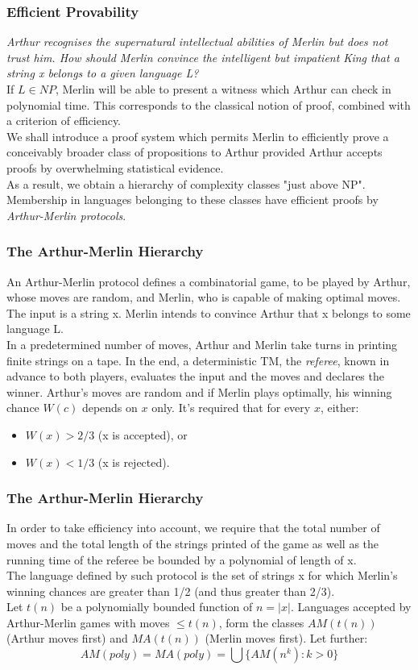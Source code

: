 \documentclass{beamer}
\begin{document}
\begin{frame}
\frametitle{Efficient Provability}
\textit{Arthur recognises the supernatural intellectual abilities of Merlin but does not trust him. How should Merlin convince the intelligent but impatient King that a string x belongs to a given language L?}\\
If $L \in NP$, Merlin will be able to present a witness which Arthur can check in polynomial time. This corresponds to the classical notion of proof, combined with a criterion of efficiency.\\
We shall introduce a proof system which permits Merlin to efficiently prove a conceivably broader class of propositions to Arthur provided Arthur accepts proofs by overwhelming statistical evidence.\\
As a result, we obtain a hierarchy of complexity classes "just above NP". Membership in languages belonging to these classes have efficient proofs by \textit{Arthur-Merlin protocols}.
\end{frame}

\begin{frame}
\frametitle{The Arthur-Merlin Hierarchy}
An Arthur-Merlin protocol defines a combinatorial game, to be played by Arthur, whose moves are random, and Merlin, who is capable of making optimal moves.\\
The input is a string x. Merlin intends to convince Arthur that x belongs to some language L.\\
In a predetermined number of moves, Arthur and Merlin take turns in printing finite strings on a tape. In the end, a deterministic TM, the \textit{referee}, known in advance to both players, evaluates the input and the moves and declares the winner. Arthur's moves are random and if Merlin plays optimally, his winning chance $W(c)$ depends on $x$ only. It's required that for every $x$, either:
\begin{itemize}
	\item $W(x) > 2/3$ (x is accepted), or
    \item $W(x) < 1/3$ (x is rejected).
\end{itemize}
\end{frame}

\begin{frame}
\frametitle{The Arthur-Merlin Hierarchy}
In order to take efficiency into account, we require that the total number of moves and the total length of the strings printed of the game as well as the running time of the referee be bounded by a polynomial of length of x.\\
The language defined by such protocol is the set of strings x for which Merlin's winning chances are greater than 1/2 (and thus greater than 2/3).\\
Let $t(n)$ be a polynomially bounded function of $n = |x|$. Languages accepted by Arthur-Merlin games with moves $\leq t(n)$, form the classes $AM(t(n))$ (Arthur moves first) and $MA(t(n))$ (Merlin moves first). Let further:
$$AM(poly) = MA(poly) = \bigcup \{AM(n^k): k > 0\}$$
\end{frame}
\end{document}
